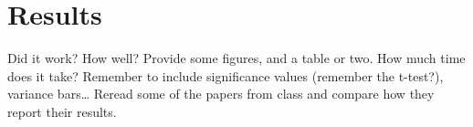 \section{Results}
\label{05}

Did it work? How well? Provide some figures, and a table or two. How much time does it take? Remember to include significance values (remember the t-test?), variance bars… Reread some of the papers from class and compare how they report their results.